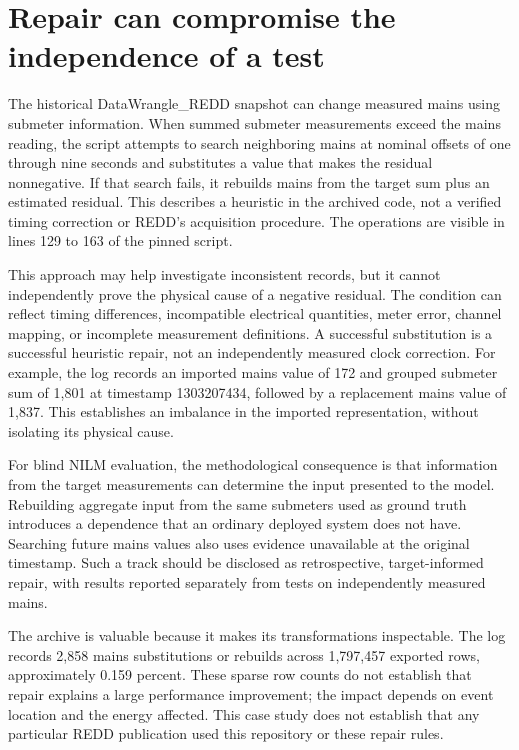\documentclass[11pt,letterpaper]{article}
\begin{document}
\section{Repair can compromise the independence of a test}
The historical DataWrangle\_REDD snapshot can change measured mains using submeter information. When summed submeter measurements exceed the mains reading, the script attempts to search neighboring mains at nominal offsets of one through nine seconds and substitutes a value that makes the residual nonnegative. If that search fails, it rebuilds mains from the target sum plus an estimated residual. This describes a heuristic in the archived code, not a verified timing correction or REDD's acquisition procedure. The operations are visible in lines 129 to 163 of the pinned script. \cite{ref4}

This approach may help investigate inconsistent records, but it cannot independently prove the physical cause of a negative residual. The condition can reflect timing differences, incompatible electrical quantities, meter error, channel mapping, or incomplete measurement definitions. A successful substitution is a successful heuristic repair, not an independently measured clock correction. For example, the log records an imported mains value of 172 and grouped submeter sum of 1,801 at timestamp 1303207434, followed by a replacement mains value of 1,837. This establishes an imbalance in the imported representation, without isolating its physical cause. \cite{ref5}

For blind NILM evaluation, the methodological consequence is that information from the target measurements can determine the input presented to the model. Rebuilding aggregate input from the same submeters used as ground truth introduces a dependence that an ordinary deployed system does not have. Searching future mains values also uses evidence unavailable at the original timestamp. Such a track should be disclosed as retrospective, target-informed repair, with results reported separately from tests on independently measured mains.

The archive is valuable because it makes its transformations inspectable. The log records 2,858 mains substitutions or rebuilds across 1,797,457 exported rows, approximately 0.159 percent. These sparse row counts do not establish that repair explains a large performance improvement; the impact depends on event location and the energy affected. This case study does not establish that any particular REDD publication used this repository or these repair rules.
\end{document}
